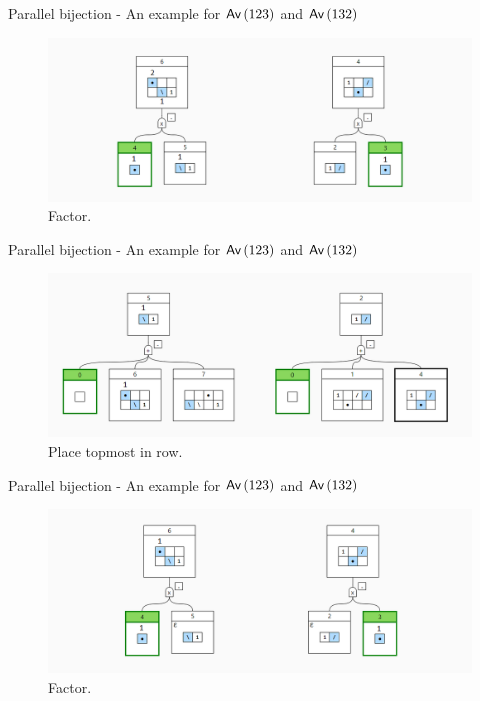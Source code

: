 \begin{frame}{Parallel bijection - An example for $\textsf{Av}\left(123\right)$ and $\textsf{Av}\left(132\right)$}
    \begin{figure}
        \centering
        \includegraphics[scale=0.4]{graphics/step08.png}
        \caption{Factor.}
    \end{figure}
\end{frame}

\begin{frame}{Parallel bijection - An example for $\textsf{Av}\left(123\right)$ and $\textsf{Av}\left(132\right)$}
    \begin{figure}
        \centering
        \includegraphics[scale=0.4]{graphics/step09.png}
        \caption{Place topmost in row.}
    \end{figure}
\end{frame}

\begin{frame}{Parallel bijection - An example for $\textsf{Av}\left(123\right)$ and $\textsf{Av}\left(132\right)$}
    \begin{figure}
        \centering
        \includegraphics[scale=0.4]{graphics/step10.png}
        \caption{Factor.}
    \end{figure}
\end{frame}

